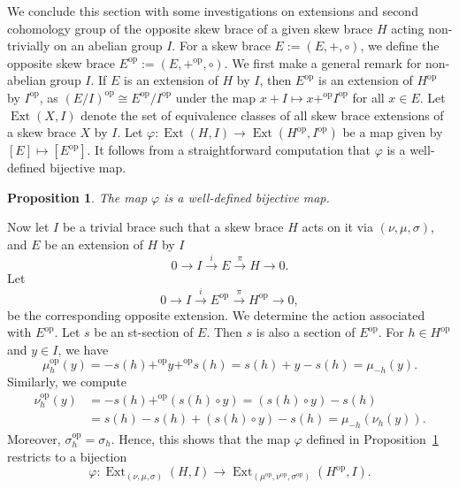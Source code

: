 \documentclass[11pt]{amsart}
\theoremstyle{thrm}
\theoremstyle{plain}
\newtheorem{prop}[thm]{Proposition}
\newtheorem{remark}[thm]{Remark}
\theoremstyle{definition}
\newcommand{\Ext}{\operatorname{Ext} }
\numberwithin{equation}{section}
\newcommand{\op}{\operatorname{op} }
\begin{document}
We conclude this section with some investigations on extensions and second cohomology group of the opposite skew brace of a given skew brace $H$ acting non-trivially on an abelian group $I$.
 For a skew brace $E := (E, +, \circ)$, we define the opposite skew brace  $E^{\op} := (E, +^{\op}, \circ)$. We first make a general remark for non-abelian group $I$. If $E$ is an extension of $H$ by $I$, then $E^{\op}$ is an extension of $H^{\op}$ by $I^{\op}$, as $(E/I)^{\op} \cong E^{\op}/I^{\op}$ under the map $x + I \mapsto x +^{\op} I^{\op}$ for all $x \in E$. Let $\Ext(X, I)$ denote the set of equivalence classes of all skew brace extensions of a skew brace $X$ by $I$. Let $\varphi: \Ext(H, I) \rightarrow \Ext(H^{\op}, I^{\op})$ be a map given by   $[E] \mapsto [E^{\op}]$. It follows from  a straightforward computation that $\varphi$ is a well-defined bijective map. 

\begin{prop}\label{bijection1}
The map $\varphi$ is a well-defined bijective map.
\end{prop} 



Now let $I$ be a trivial brace such that a skew brace $H$ acts on it via  $(\nu, \mu, \sigma)$, and $E$ be an extension of $H$ by $I$
\[
0 \longrightarrow I \xrightarrow{i} E \xrightarrow{\pi} H \longrightarrow 0.
\]
Let 
\[
0 \longrightarrow I \xrightarrow{i} E^{\op} \xrightarrow{\pi} H^{\op} \longrightarrow 0,
\]
be the corresponding opposite extension. We determine the action associated with $E^{\op}$.
Let $s$ be an st-section of $E$. Then $s$ is also a section of $E^{\op}$. For $h \in H^{\op}$ and $y \in I$, we have
$$\mu^{\op}_h(y) = -s(h) +^{\op} y +^{\op} s(h) = s(h) + y - s(h) = \mu_{-h}(y).$$
Similarly, we compute
\begin{align*}
	\nu^{\op}_h(y) 
	&= -s(h) +^{\op} (s(h) \circ y) = (s(h) \circ y) - s(h) \\
	&= s(h) - s(h) + (s(h) \circ y) - s(h) = \mu_{-h}(\nu_h(y)).
\end{align*}
Moreover, $\sigma^{\op}_h = \sigma_h$. Hence, this shows that the map $\varphi$ defined in Proposition~\ref{bijection1} restricts to a bijection
\[
\varphi : \Ext_{(\nu, \mu, \sigma)}(H, I) \longrightarrow \Ext_{(\mu^{\op}, \nu^{\op}, \sigma^{\op})}(H^{\op}, I).
\]

\end{document}
